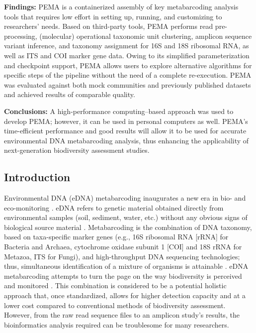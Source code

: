    \textbf{Findings:}
   PEMA is a containerized assembly of key metabarcoding analysis tools that requires low effort in setting up, running, and customizing to researchers' needs. 
   Based on third-party tools, PEMA performs read pre-processing, (molecular) operational taxonomic unit 
   clustering, amplicon sequence variant inference, and taxonomy assignment for 16S and 18S ribosomal RNA, as well as ITS and COI marker gene data. 
   Owing to its simplified parameterization and checkpoint support, PEMA allows users to explore alternative algorithms for specific steps of the pipeline without the need of a complete re-execution. 
   PEMA was evaluated against both mock communities and previously published datasets and achieved results of comparable quality.

   \textbf{Conclusions:}
   A high-performance computing–based approach was used to develop PEMA; however, it can be used in personal computers as well. 
   PEMA's time-efficient performance and good results will allow it to be used for accurate environmental DNA metabarcoding analysis, thus enhancing the applicability of next-generation biodiversity assessment studies.
   
   \subsection{Introduction}

   Environmental DNA (eDNA) metabarcoding inaugurates a new era in bio- and eco-monitoring \citep{pavan2015dna}. 
   eDNA refers to genetic material obtained directly from environmental samples (soil, sediment, water, etc.) without any obvious signs of biological source material \citep{thomsen2015environmental}. 
   Metabarcoding is the combination of DNA taxonomy, based on taxa-specific marker genes (e.g., 16S ribosomal RNA [rRNA] for Bacteria and Archaea, cytochrome oxidase subunit 1 [COI] and 18S rRNA for Metazoa, ITS for Fungi), and high-throughput DNA sequencing technologies; thus, simultaneous identification of a mixture of organisms is attainable \citep{ji2013reliable}. 
   eDNA metabarcoding attempts to turn the page on the way biodiversity is perceived and monitored \citep{ji2013reliable}. 
   This combination is considered to be a potential holistic approach that, once standardized, allows for higher detection capacity and at a lower cost compared to conventional methods of biodiversity assessment. 
   However, from the raw read sequence files to an amplicon study's results, the bioinformatics analysis required can be troublesome for many researchers.


